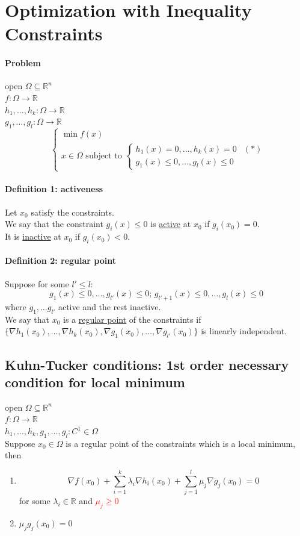 \documentclass[11pt]{article}
\newcommand{\real}[0]{\mathbb{R}}
\newcommand{\under}[1]{\underline{#1}}
\begin{document}
\section{Optimization with Inequality Constraints}
\paragraph{Problem}
open $\Omega \subseteq \real^n$\\
$f: \Omega \rightarrow \real$ \\
$h_1, \hdots, h_k: \Omega \rightarrow \real$ \\
$g_1, \hdots, g_l: \Omega \rightarrow \real$ \\
$$\begin{cases}
	\min f(x) \\
	x \in \Omega \text{ subject to } 
\begin{cases}
	h_1(x) = 0, \hdots, h_k(x) = 0 \\
	g_1(x) \leq 0, \hdots, g_l(x) \leq 0
\end{cases}
\end{cases}(*)$$

\paragraph{Definition 1: activeness}
Let $x_0$ satisfy the constraints. \\
We say that the constraint $g_i(x) \leq 0$ is \under{active} at $x_0$ if $g_i(x_0) = 0$. \\ It is \under{inactive} at $x_0$ if $g_i(x_0) < 0$.\\
\paragraph{Definition 2: regular point}
Suppose for some $l' \leq l$:
$$g_1(x) \leq 0, \hdots, g_{l'}(x) \leq 0; \, g_{l' + 1}(x) \leq 0, \hdots, g_l(x) \leq 0$$
where $g_1, \hdots g_{l'}$ active and the rest inactive. \\
We say that $x_0$ is a \under{regular point} of the constraints if \\
$\{\nabla h_1(x_0), \hdots, \nabla h_k(x_0), \nabla g_1(x_0), \hdots, \nabla g_{l'}(x_0)\}$ is linearly independent.

\subsection{Kuhn-Tucker conditions: 1st order necessary condition for local minimum}
open $\Omega \subseteq \real^n$\\
$f: \Omega \rightarrow \real$ \\
$h_1, \hdots, h_k, g_1, \hdots, g_l: C^1 \in \Omega$ \\
Suppose $x_0 \in \Omega$ is a regular point of the constraints which is a local minimum, then
\begin{enumerate}
	\item $$\nabla f(x_0) + \sum_{i=1}^k \lambda_i \nabla h_i(x_0) + \sum_{j=1}^l \mu_j \nabla g_j(x_0) = 0$$ for some $\lambda_i \in \real$ and \textcolor{red}{$\mu_j \geq 0$}
	\item $\mu_j g_j(x_0) = 0$
\end{enumerate}
\end{document}
